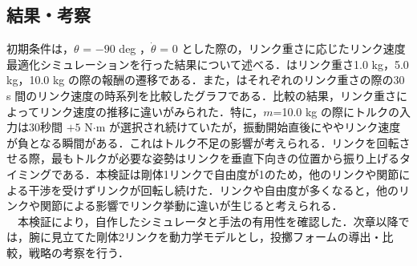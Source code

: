 \subsection{結果・考察}
初期条件は，$\theta$ = $-90$ deg ，$\dot{\theta}$ = 0 とした際の，リンク重さに応じたリンク速度最適化シミュレーションを行った結果について述べる．はリンク重さ1.0 kg，5.0 kg，10.0 kg の際の報酬の遷移である．また，はそれぞれのリンク重さの際の30 s 間のリンク速度の時系列を比較したグラフである．比較の結果，リンク重さによってリンク速度の推移に違いがみられた．特に，$m$=10.0 kg の際にトルクの入力は30秒間 $+ 5$ N$\cdot$m が選択され続けていたが，振動開始直後にややリンク速度が負となる瞬間がある．これはトルク不足の影響が考えられる．リンクを回転させる際，最もトルクが必要な姿勢はリンクを垂直下向きの位置から振り上げるタイミングである．本検証は剛体1リンクで自由度が1のため，他のリンクや関節による干渉を受けずリンクが回転し続けた．リンクや自由度が多くなると，他のリンクや関節による影響でリンク挙動に違いが生じると考えられる．\\
　本検証により，自作したシミュレータと手法の有用性を確認した．次章以降では，腕に見立てた剛体2リンクを動力学モデルとし，投擲フォームの導出・比較，戦略の考察を行う．

